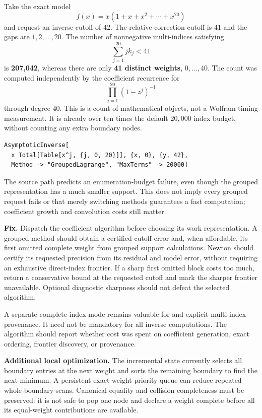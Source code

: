 \documentclass[11pt,letterpaper]{article}
\newcommand{\code}[1]{\texttt{\small\detokenize{#1}}}
\begin{document}
Take the exact model
\[
 f(x)=x(1+x+x^2+\cdots+x^{20})
\]
and request an inverse cutoff of $42$. The relative correction cutoff is $41$ and the gaps are $1,2,\ldots,20$. The number of nonnegative multi-indices satisfying
\[
 \sum_{j=1}^{20}j k_j<41
\]
is \textbf{207,042}, whereas there are only \textbf{41 distinct weights}, $0,\ldots,40$. The count was computed independently by the coefficient recurrence for
\[
 \prod_{j=1}^{20}(1-z^j)^{-1}
\]
through degree $40$. This is a count of mathematical objects, not a Wolfram timing measurement. It is already over ten times the default $20,000$ index budget, without counting any extra boundary nodes.

\begin{lstlisting}
AsymptoticInverse[
  x Total[Table[x^j, {j, 0, 20}]], {x, 0}, {y, 42},
  Method -> "GroupedLagrange", "MaxTerms" -> 20000]
\end{lstlisting}
The source path predicts an enumeration-budget failure, even though the grouped representation has a much smaller support. This does not imply every grouped request fails or that merely switching methods guarantees a fast computation; coefficient growth and convolution costs still matter.

\textbf{Fix.} Dispatch the coefficient algorithm before choosing its work representation. A grouped method should obtain a certified cutoff error and, when affordable, its first omitted complete weight from grouped support calculations. Newton should certify its requested precision from its residual and model error, without requiring an exhaustive direct-index frontier. If a sharp first omitted block costs too much, return a conservative bound at the requested cutoff and mark the sharper frontier unavailable. Optional diagnostic sharpness should not defeat the selected algorithm.

A separate complete-index mode remains valuable for \code{InverseExpansionCoefficient} and explicit multi-index provenance. It need not be mandatory for all inverse computations. The algorithm should report whether cost was spent on coefficient generation, exact ordering, frontier discovery, or provenance.

\textbf{Additional local optimization.} The incremental state currently selects all boundary entries at the next weight and sorts the remaining boundary to find the next minimum. A persistent exact-weight priority queue can reduce repeated whole-boundary scans. Canonical equality and collision completeness must be preserved: it is not safe to pop one node and declare a weight complete before all its equal-weight contributions are available.\cite{repo-incremental}
\end{document}
